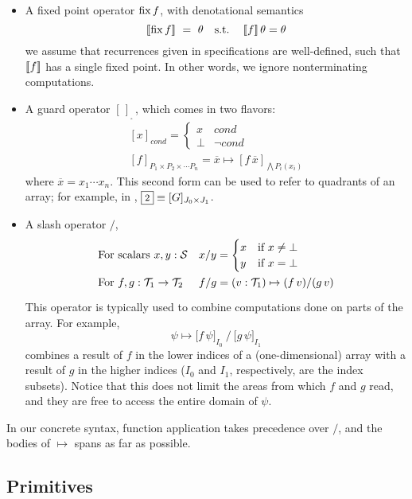 \begin{itemize}
  \item A fixed point operator $\operatorname{fix} f$, with denotational semantics
    \[[\![{\operatorname{fix} f}]\!] ~=~ \theta \textrm{ ~ s.t. ~ } [\![{f}]\!]\,\theta=\theta\]
  we assume that recurrences given in specifications are well-defined, 
  such that $[\![{f}]\!]$ has a single fixed point.
  In other words, we ignore nonterminating computations.
  \item A guard operator $[\,]_{_\square}\,$, which comes in two flavors:
  \[\begin{array}{l}
      [x]_{\mathit{cond}} = \begin{cases}x & \mathit{cond} \\ \bot & \lnot\mathit{cond}\end{cases} \\
      {}[f]_{P_1\times P_2\times \cdots P_n} = \overline{x} \mapsto [f\,\overline{x}]_{\bigwedge P_i(x_i)}
    \end{array}\]
  where $\overline{x} = x_1 \cdots x_n$. This second form can be used to
  refer to quadrants of an array; for example, in , $\qbox2 \equiv [G]_{J_0\times J_1}$.
  \item A slash operator $/$,     \vspace{-2pt}
  \[\renewcommand\arraystretch{1.5}
    \begin{array}{ll}
      \mbox{For scalars $x,y:\S$} & x/y = \begin{cases}x & \mbox{if }x\neq\bot \\ y & \mbox{if }x=\bot\end{cases} \\
      \mbox{For $f,g:\T_1\to\T_2$} & f/g = (v:\T_1)\mapsto (f\,v)/(g\,v)
    \end{array}\]
  This operator is typically used to combine computations done on
  parts of the array. For example, \[\psi\mapsto \big[f\,\psi\big]_{I_0} ~ \Big/ ~ \big[g\,\psi\big]_{I_1}\]
  combines a result of $f$ in the lower indices of a (one-dimensional) array
  with a result of $g$ in the higher indices ($I_0$ and $I_1$, respectively, are the index subsets).
  Notice that this does not limit the areas from which $f$ and $g$ read,
  and they are free to access the entire domain of $\psi$.
\end{itemize}

In our concrete syntax, function application takes precedence over $/$,
and the bodies of $\mapsto$ spans as far as possible.

\subsection{Primitives}

